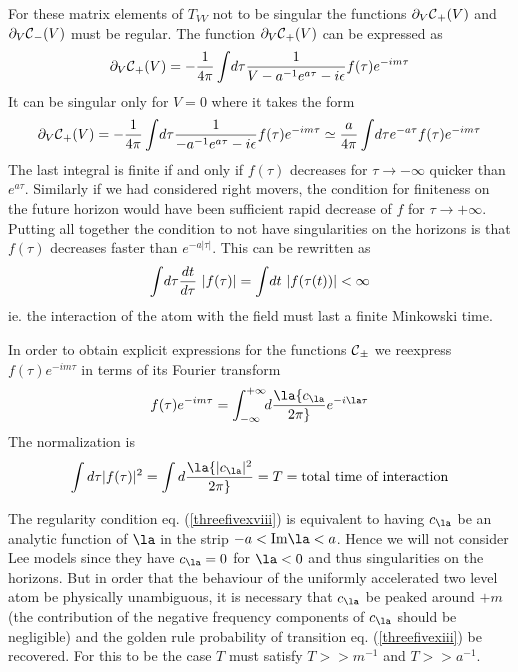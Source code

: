 For these matrix elements of $T_{VV}$ not to be singular the functions $
\partial_V
\mbox{$\cal C $}_+(V) $ and $
\partial_V \mbox{$\cal C $}_-(V) $ must be regular.
The function $ \partial_V
\mbox{$\cal C $}_+(V) $ can be expressed as
\begin{equation} \partial_V \mbox{$\cal C $}_+(V) = -{1 \over 4
\pi} \int \! d \tau {1 \over V - a^{-1}e^{a\tau} - i \mbox{$ \epsilon $}} f(\tau)e^{-im\tau}
\label{threefivexvi} \end{equation}
It can be singular only for $V=0$ where
it takes the form  \begin{equation} \partial_V \mbox{$\cal C $}_+(V) = -{1 \over 4 \pi} \int
\! d
\tau {1 \over -
a^{-1}e^{a\tau} - i \mbox{$ \epsilon $}} f(\tau)e^{-im\tau} \simeq  {a \over 4 \pi} \int \! d
\tau e^{-a\tau} f(\tau)e^{-im\tau} \label{threefivexvii} \end{equation} The
last integral is finite if and only if $f(\tau)$ decreases for $\tau
\rightarrow -\infty$ quicker than $e^{a\tau}$. Similarly if we had considered
right movers, the condition for finiteness on the future horizon would have
been sufficient rapid decrease of $f$ for $\tau \rightarrow +\infty$. Putting
all together the condition to not have singularities on the horizons is that
$f(\tau)$ decreases faster than
$e^{-a \vert \tau \vert}$.
This can be rewritten as
\begin{equation} \int \! d \tau {d t \over d \tau } \ \vert f(\tau)\vert =
\int \! dt \ \vert f(\tau(t))\vert < \infty \label{threefivexviii}
\end{equation}
ie. the interaction of the atom with the field must last a finite
Minkowski time.


In order to obtain explicit expressions for the functions $\mbox{$\cal C $}_\pm$ we
reexpress $f(\tau)e^{-im\tau}$ in terms of its Fourier transform
\begin{equation} f(\tau)e^{-im\tau} =
\int_{-\infty}^{+\infty}\!\! d\la { c_\la \over 2 \pi} e^{-i \la \tau}
\label{threefivexix}
\end{equation}
The normalization is
\begin{equation}
\int d \tau \vert f(\tau) \vert ^2 =  \int d\la { \vert c_\la \vert^2 \over 2
\pi} = T =\hbox{total time of interaction} \label{threefivexx}
\end{equation}

The regularity condition eq. (\ref{threefivexviii})
is equivalent to having $c_\la$ be an
analytic function of $\la$ in the strip $-a < {\rm Im} \la < a$. Hence we
will not consider Lee models since they
have $c_\la=0$ for $\la<0$ and thus singularities on the horizons.
But in order that the behaviour of the uniformly accelerated two level atom
be physically
unambiguous, it is necessary that $c_\la$ be peaked around
$+m$
(the contribution of the negative frequency components of $c_\la$ should be
negligible) and  the golden rule probability of transition
eq. (\ref{threefivexiii}) be recovered. For this to
be the case $T$ must satisfy
 $T >>  m^{-1} $ and $T>>a^{-1} $.

